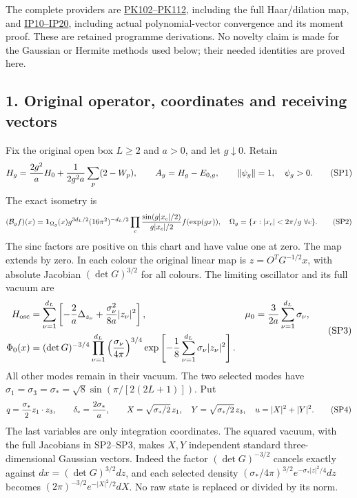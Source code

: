 \documentclass[11pt]{article}
\begin{document}
The complete providers are \href{https://github.com/KokunoYumeto/yang-mills-interacting-workbench/blob/485b61423c1f4e1805deb453c1b6b342b27842b6/yang-mills/continuations/20260930-s6-ns-moment-map-bridge/PERIOD_COUPLING_AND_PHYSICAL_KERNELS.md#L2434}{PK102–PK112}, including the full Haar/dilation map, and \href{https://github.com/KokunoYumeto/yang-mills-interacting-workbench/blob/256d0fb1988e810df3fcb796c54077c564d48672/yang-mills/continuations/20261011-central-signs-shrinking-window/PHASE_MOMENTS_AND_ORIGINAL_PATH.md}{IP10–IP20}, including actual polynomial-vector convergence and its moment proof. These are retained programme derivations. No novelty claim is made for the Gaussian or Hermite methods used below; their needed identities are proved here.

\subsection*{1. Original operator, coordinates and receiving vectors}

Fix the original open box \(L\ge2\) and \(a>0\), and let \(g\downarrow0\). Retain
\[
 H_g={2g^2\over a}H_0+{1\over2g^2a}\sum_p(2-W_p),\qquad
 A_g=H_g-E_{0,g},\qquad \|\psi_g\|=1,\quad\psi_g>0.
 \tag{SP1}
\]
The exact isometry is
\[
 (\mathcal B_g f)(x)=\mathbf1_{\Omega_g}(x)g^{3d_L/2}
 (16\pi^2)^{-d_L/2}\prod_c{\sin(g|x_c|/2)\over g|x_c|/2}
 f(\exp(gx)),\quad \Omega_g=\{x:|x_c|<2\pi/g\ \forall c\}.
 \tag{SP2}
\]
The sinc factors are positive on this chart and have value one at zero. The map extends by zero. In each colour the original linear map is \(z=O^TG^{-1/2}x\), with absolute Jacobian \((\det G)^{3/2}\) for all colours. The limiting oscillator and its full vacuum are
\[
\begin{aligned}
 H_{\rm osc}&=\sum_{\nu=1}^{d_L}
 \left[-{2\over a}\Delta_{z_\nu}+{\sigma_\nu^2\over8a}|z_\nu|^2\right],
 &\mu_0&={3\over2a}\sum_{\nu=1}^{d_L}\sigma_\nu,\\
 \Phi_0(x)&=(\det G)^{-3/4}
 \prod_{\nu=1}^{d_L}\left({\sigma_\nu\over4\pi}\right)^{3/4}
 \exp\left[-{1\over8}\sum_{\nu=1}^{d_L}\sigma_\nu|z_\nu|^2\right].
\end{aligned}\tag{SP3}
\]
All other modes remain in their vacuum. The two selected modes have
\(\sigma_1=\sigma_3=\sigma_* =\sqrt8\sin(\pi/[2(2L+1)])\).
Put
\[
 q={\sigma_*\over2}z_1\cdot z_3,\qquad
 \delta_*={2\sigma_*\over a},\qquad
 X=\sqrt{\sigma_*/2}\,z_1,\quad Y=\sqrt{\sigma_*/2}\,z_3,
 \quad u=|X|^2+|Y|^2.
 \tag{SP4}
\]
The last variables are only integration coordinates. The squared vacuum, with the full Jacobians in SP2–SP3, makes \(X,Y\) independent standard three-dimensional Gaussian vectors. Indeed the factor \((\det G)^{-3/2}\) cancels exactly against \(dx=(\det G)^{3/2}dz\), and each selected density \((\sigma_*/4\pi)^{3/2}e^{-\sigma_*|z|^2/4}dz\) becomes \((2\pi)^{-3/2}e^{-|X|^2/2}dX\). No raw state is replaced or divided by its norm.
\end{document}
